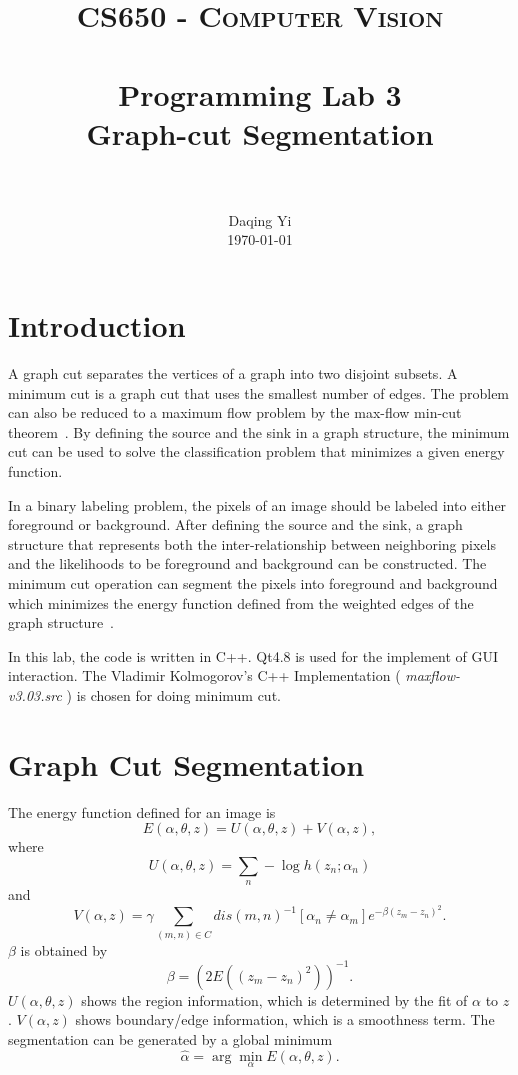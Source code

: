 \documentclass[paper=a4, fontsize=11pt]{scrartcl}
\title{
		\usefont{OT1}{bch}{b}{n}
		\normalfont \normalsize \textsc{CS650 - Computer Vision} \\ [25pt]
		\horrule{0.5pt} \\[0.4cm]
		\huge Programming Lab 3 \\ Graph-cut Segmentation \\
		\horrule{2pt} \\[0.5cm]
}
\author{
		\normalfont 								\normalsize
        Daqing Yi\\[-3pt]		\normalsize
        \today
}
\date{}
\begin{document}
\maketitle

\section{Introduction}

A graph cut separates the vertices of a graph into two disjoint subsets.
A minimum cut is a graph cut that uses the smallest number of edges.
The problem can also be reduced to a maximum flow problem by the max-flow min-cut theorem~\cite{wiki:Max-flow_min-cut_theorem}.
By defining the source and the sink in a graph structure, the minimum cut can be used to solve the classification problem that minimizes a given energy function.

In a binary labeling problem, the pixels of an image should be labeled into either foreground or background.
After defining the source and the sink, a graph structure that represents both the inter-relationship between neighboring pixels and the likelihoods to be foreground and background can be constructed.
The minimum cut operation can segment the pixels into foreground and background which minimizes the energy function defined from the weighted edges of the graph structure~\cite{937505}.

In this lab, the code is written in C++.
Qt4.8 is used for the implement of GUI interaction.
The Vladimir Kolmogorov's C++ Implementation ( \emph{ maxflow-v3.03.src } ) is chosen for doing minimum cut.

\section{Graph Cut Segmentation}

The energy function defined for an image is~\cite{rother2004grabcut} 
\begin{equation}
E(\alpha, \theta, z) = U( \alpha, \theta, z ) + V(\alpha, z),
\end{equation} 
where
\begin{equation}
U( \alpha, \theta, z ) = \sum_{n} - \log h( z_{n} ; \alpha_{n} )
\end{equation}
and
\begin{equation}
V(\alpha, z) = \gamma \sum_{ (m, n) \in C } dis(m, n)^{-1} [\alpha_{n} \neq \alpha_{m} ] e^{ - \beta (z_{m} - z_{n})^{2} }.
\end{equation}
$ \beta $ is obtained by 
\begin{equation}
\beta = (2 E( (z_{m} - z_{n})^{2} ) )^{-1}.
\end{equation} 
$ U( \alpha, \theta, z ) $ shows the region information, which is determined by the fit of $ \alpha $ to $ z $.
$ V(\alpha, z) $ shows boundary/edge information, which is a smoothness term.
The segmentation can be generated by a global minimum
\begin{equation}
\hat{ \alpha } = \arg \min_{\alpha} E(\alpha, \theta, z).
\end{equation}
\end{document}
